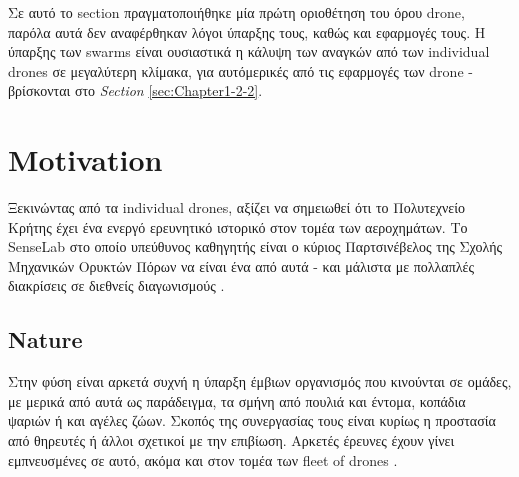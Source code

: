 Σε αυτό το section πραγματοποιήθηκε μία πρώτη οριοθέτηση του όρου drone, παρόλα αυτά
δεν αναφέρθηκαν λόγοι ύπαρξης τους, καθώς και εφαρμογές τους.  Η ύπαρξης των swarms είναι ουσιαστικά η 
κάλυψη των αναγκών από των individual drones σε μεγαλύτερη κλίμακα, για αυτό\udot μερικές από τις εφαρμογές των drone - βρίσκονται
στο \emph{Section} \ref{sec:Chapter1-2-2}.


\section{Motivation} \label{sec:Chapter1-2} 
Ξεκινώντας από τα individual drones, αξίζει να σημειωθεί ότι το Πολυτεχνείο Κρήτης έχει ένα ενεργό
ερευνητικό ιστορικό στον τομέα των αεροχημάτων. Το SenseLab στο οποίο υπεύθυνος καθηγητής είναι ο κύριος
Παρτσινέβελος της Σχολής Μηχανικών Ορυκτών Πόρων να είναι ένα από αυτά -
και μάλιστα με πολλαπλές διακρίσεις  σε διεθνείς διαγωνισμούς \cite{senselab-site} \cite{senselab-demo}. 

\subsection{Nature} \label{sec:Chapter1-2-1}
Στην φύση είναι αρκετά συχνή η ύπαρξη έμβιων οργανισμός που κινούνται σε ομάδες, με μερικά από αυτά ως παράδειγμα, τα σμήνη από πουλιά και
έντομα, κοπάδια ψαριών ή και αγέλες ζώων. Σκοπός της συνεργασίας τους είναι κυρίως η προστασία από θηρευτές ή άλλοι σχετικοί με την επιβίωση.
Αρκετές έρευνες έχουν γίνει εμπνευ\-σμένες σε αυτό, ακόμα και στον τομέα των fleet of drones
\cite{research-on-drone-swarms-move-like-animals} \cite{research-on-drone-swarms-move-like-animals-like-documentary} \cite{swarm-of-drones}.
  
